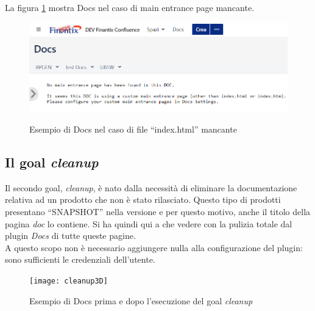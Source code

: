 	La figura \ref{errorDocs} mostra Docs nel caso di main entrance page mancante.

	\begin{figure}[H]
		\centering
		\includegraphics[width=\textwidth]{immagini/indexError.png}\\
		\caption{Esempio di Docs nel caso di file ``index.html'' mancante}
		\label{errorDocs}
	\end{figure}


\subsection{Il goal \emph{cleanup}}
Il secondo goal, \emph{cleanup}, è nato dalla necessità di eliminare la documentazione relativa ad un prodotto che non è stato rilasciato.
Questo tipo di prodotti presentano ``SNAPSHOT'' nella versione e per questo motivo, anche il titolo della pagina \emph{doc} lo contiene.
Si ha quindi qui a che vedere con la pulizia totale dal plugin \emph{Docs} di tutte queste pagine. \\
A questo scopo non è necessario aggiungere nulla alla configurazione del plugin: sono sufficienti le credenziali dell'utente. 

\begin{figure}[H]
	\centering
	\texttt{[image: cleanup3D]}\\
	\caption{Esempio di Docs prima e dopo l'esecuzione del goal \emph{cleanup}}
	\label{cleanupBeforeAfter}
\end{figure}






